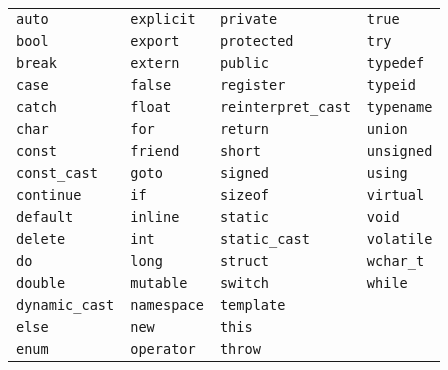 \begin{frame}[fragile]
  \begin{table}
    \centering
    \begin{tabular}{p{2.5cm}|p{2cm}|p{3cm}|p{2cm}}\hline
      \lstinline|auto|         & \lstinline|explicit|  & \lstinline|private|          & \lstinline|true| \\
      \lstinline|bool|         & \lstinline|export|    & \lstinline|protected|        & \lstinline|try| \\
      \lstinline|break|        & \lstinline|extern|    & \lstinline|public|           & \lstinline|typedef| \\
      \lstinline|case|         & \lstinline|false|     & \lstinline|register|         & \lstinline|typeid| \\
      \lstinline|catch|        & \lstinline|float|     & \lstinline|reinterpret_cast| & \lstinline|typename| \\
      \lstinline|char|         & \lstinline|for|       & \lstinline|return|           & \lstinline|union| \\
      \lstinline|const|        & \lstinline|friend|    & \lstinline|short|            & \lstinline|unsigned|\\
      \lstinline|const_cast|   & \lstinline|goto|      & \lstinline|signed|           & \lstinline|using|  \\
      \lstinline|continue|     & \lstinline|if|        & \lstinline|sizeof|           & \lstinline|virtual|  \\
      \lstinline|default|      & \lstinline|inline|    & \lstinline|static|           & \lstinline|void|  \\
      \lstinline|delete|       & \lstinline|int|       & \lstinline|static_cast|      & \lstinline|volatile| \\
      \lstinline|do|           & \lstinline|long|      & \lstinline|struct|           & \lstinline|wchar_t|  \\
      \lstinline|double|       & \lstinline|mutable|   & \lstinline|switch|           & \lstinline|while|  \\
      \lstinline|dynamic_cast| & \lstinline|namespace| & \lstinline|template|         &   \\
      \lstinline|else|         & \lstinline|new|       & \lstinline|this|             &   \\
      \lstinline|enum|         & \lstinline|operator|  & \lstinline|throw|            &   \\ \hline
    \end{tabular}
  \end{table}
\end{frame}










